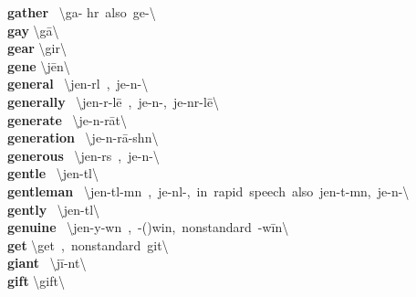\documentclass[10pt,a4paper]{article}
\begin{document}
\begin{multicols}{2}
\textbf{ gather }\quad \ \textbackslash \textprimstress ga- h\textschwa r\ also\ \textprimstress ge-\textbackslash \\
\textbf{ gay }\quad \textbackslash \textprimstress g\={a}\textbackslash \\
\textbf{ gear }\quad \textbackslash \textprimstress gir\textbackslash \\
\textbf{ gene }\quad \textbackslash \textprimstress j\={e}n\textbackslash \\
\textbf{ general }\quad \ \textbackslash \textprimstress jen-r\textschwa l\ ,\ \textprimstress je-n\textschwa -\textbackslash \\
\textbf{ generally }\quad \ \textbackslash \textprimstress jen-r\textschwa -l\={e}\ ,\ \textprimstress je-n\textschwa -,\ \textprimstress je-n\textschwa r-l\={e}\textbackslash \\
\textbf{ generate }\quad \ \textbackslash \textprimstress je-n\textschwa -\textsecstress r\={a}t\textbackslash \\
\textbf{ generation }\quad \ \textbackslash \textsecstress je-n\textschwa -\textprimstress r\={a}-sh\textschwa n\textbackslash \\
\textbf{ generous }\quad \ \textbackslash \textprimstress jen-r\textschwa s\ ,\ \textprimstress je-n\textschwa -\textbackslash \\
\textbf{ gentle }\quad \ \textbackslash \textprimstress jen-t\textsuperscript{\textreve}l\textbackslash \\
\textbf{ gentleman }\quad \ \textbackslash \textprimstress jen-t\textsuperscript{\textreve}l-m\textschwa n\ ,\ \textprimstress je-n\textsuperscript{\textreve}l-,\ in\ rapid\ speech\ also\ \textprimstress jen-t\textschwa -m\textschwa n,\ \textprimstress je-n\textschwa -\textbackslash \\
\textbf{ gently }\quad \ \textbackslash \textprimstress jen-t\textsuperscript{\textreve}l\textbackslash \\
\textbf{ genuine }\quad \ \textbackslash \textprimstress jen-y\textschwa -w\textschwa n\ ,\ -(\textsecstress )win,\ nonstandard\ -\textsecstress w\={i}n\textbackslash \\
\textbf{ get }\quad \textbackslash \textprimstress get\ ,\ nonstandard\ \textprimstress git\textbackslash \\
\textbf{ giant }\quad \ \textbackslash \textprimstress j\={i}-\textschwa nt\textbackslash \\
\textbf{ gift }\quad \textbackslash \textprimstress gift\textbackslash \\

\end{multicols}
\end{document}
